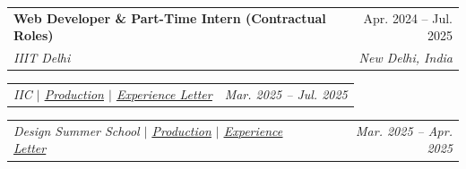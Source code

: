 \documentclass[letterpaper,11pt]{article}
\makeatletter
\newcommand{\resumeItem}[1]{
  \item\small{
    {#1 \vspace{-2pt}}
  }
}
\newcommand{\resumeSubheading}[4]{
  \vspace{-2pt}\item
    \begin{tabular*}{0.97\textwidth}[t]{l@{\extracolsep{\fill}}r}
      \textbf{#1} & #2 \\
      \textit{\small#3} & \textit{\small #4} \\
    \end{tabular*}\vspace{-7pt}
}
\newcommand{\resumeSubSubheading}[2]{
    \item
    \begin{tabular*}{0.97\textwidth}{l@{\extracolsep{\fill}}r}
      \textit{\small#1} & \textit{\small #2} \\
    \end{tabular*}\vspace{-7pt}
}
\newcommand{\resumeSubHeadingListEnd}{\end{itemize}}
\newcommand{\resumeItemListStart}{\begin{itemize}}
\newcommand{\resumeItemListEnd}{\end{itemize}\vspace{-5pt}}
\makeatother
\begin{document}
      

\resumeSubheading
  {Web Developer \& Part-Time Intern (Contractual Roles) }{Apr. 2024 -- Jul. 2025}
  {IIIT Delhi}{New Delhi, India}
  
    \resumeSubSubheading
    {IIC $|$ 
    \href{https://ecell.iiitd.edu.in/}{\underline{Production}} $|$ \href{https://drive.google.com/file/d/15J8h-KHd-D_vZ8FEkdgwQNcVEaaCNLBa/view}{\underline{Experience Letter}}}{Mar. 2025 -- Jul. 2025}
  
    \resumeSubSubheading
    {Design Summer School $|$ \href{https://dss2025.iiitd.edu.in/}{\underline{Production}} $|$ \href{https://drive.google.com/file/d/1ZBmdpn35tOQ6O-hA4DlZQFGS6P-6t2TZ/view}{\underline{Experience Letter}}}{Mar. 2025 -- Apr. 2025}
\end{document}
